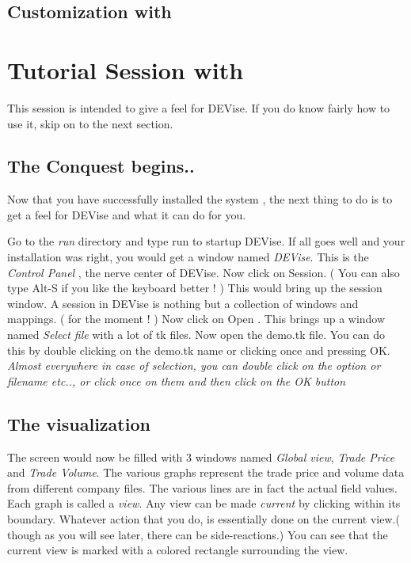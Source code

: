\subsection{Customization with }


\section{Tutorial Session with \Devise}
{\em
  
  This session is intended to give a feel for DEVise. If you do know fairly how to use it, skip on to the next section.

}



\subsection{ The Conquest begins..}
	

	Now that you have successfully installed the system , the next thing to do is to get a feel for DEVise and what it can do for you.


	Go to the {\em run } directory and type run to startup DEVise. If all goes well and your installation was right, you would get a window named {\em DEVise}. This is the {\em Control Panel }, the nerve center of DEVise. Now click on Session. ( You can also type Alt-S if you like the keyboard better ! ) This would bring up the session window. A session in DEVise is nothing but a collection of windows and mappings. ( for the moment ! ) Now click on Open . This brings up a window named {\em Select file } with a lot of tk files. Now open the demo.tk file. You can do this by double clicking on the demo.tk name or clicking once and pressing OK. {\em Almost everywhere in case of selection, you can double click on the option or filename etc.., or click once on them and then click on the OK button }

\subsection{ The visualization }


	The screen would now be filled with  3 windows named {\em Global view}, {\em Trade Price} and {\em Trade Volume}. The various graphs represent the trade price and volume data from different company files. The various lines are in fact the actual field values. Each graph is called a {\em view}. Any view can be made {\em current } by clicking within its boundary. Whatever action that you do, is essentially done on the current view.( though as you will see later, there can be side-reactions.) You can see that the current view is marked with a colored rectangle surrounding the view.


